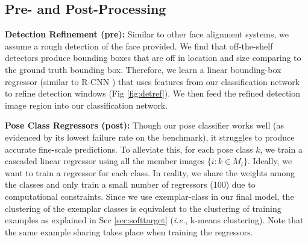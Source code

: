 \documentclass[letterpaper]{article} %
\newcommand{\ie}{\textit{i.e.}}
\begin{document}
\subsection{Pre- and Post-Processing}

{\bf Detection Refinement (pre):}
Similar to other face alignment systems, we assume a rough detection of the face provided. We find that off-the-shelf detectors produce bounding boxes that are off in location and size comparing to the ground truth bounding box. Therefore, we learn a linear bounding-box regressor (similar to R-CNN \cite{girshick14CVPR}) that uses features from our classification network to refine detection windows (Fig \ref{fig:detref}). We then feed the refined detection image region into our classification network.

{\bf Pose Class Regressors (post):}
Though our pose classifier works well (as evidenced by its lowest failure rate on the benchmark), it struggles to produce accurate fine-scale predictions.
To alleviate this, for each pose class $k$, we train a cascaded linear regressor \cite{Xiong2013} using all the member images $\{i: k \in M_i\}$.
Ideally, we want to train a regressor for each class. In reality, we share the weights among the classes and only train a small number of regressors (100) due to computational constraints. Since we use exemplar-class in our final model, the clustering of the exemplar classes is equivalent to the clustering of training examples as explained in Sec \ref{sec:softtarget}
(\ie, k-means clustering).  Note that the same example sharing takes place when training the regressors.

\end{document}
